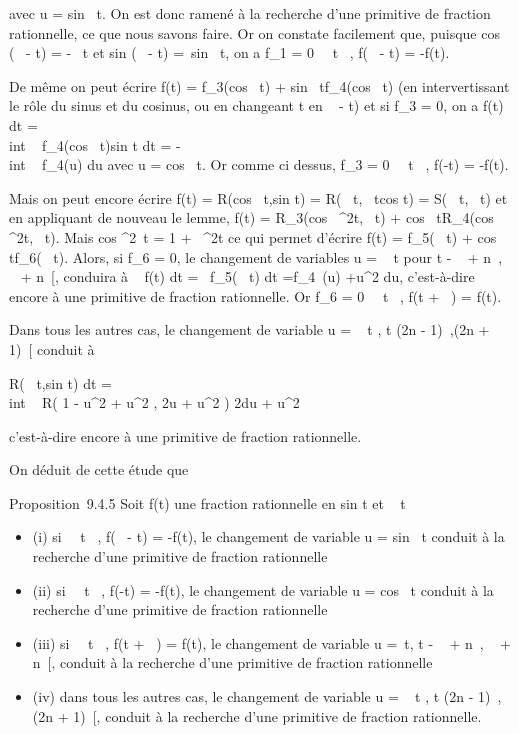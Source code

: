 \documentclass[]{article}
\begin{document}
avec u = sin~ t. On est donc ramené à la
recherche d'une primitive de fraction rationnelle, ce que nous savons
faire. Or on constate facilement que, puisque
cos (\pi~ - t) = -\cos~ t
et sin (\pi~ - t) =\ sin~
t, on a f\_1 = 0 \Leftrightarrow
\forall~~t \in {}~, f(\pi~ - t) = -f(t).

De même on peut écrire f(t) = f\_3(cos~
t) + sin~
tf\_4(cos~ t) (en intervertissant le
rôle du sinus et du cosinus, ou en changeant t en  \pi~
 - t) et si f\_3 = 0, on a
\int  f(t) dt =\\int ~
f\_4(cos~
t)sin t dt = -\\int ~
f\_4(u) du avec u = cos~ t. Or comme ci
dessus, f\_3 = 0 \Leftrightarrow
\forall~~t \in {}~, f(-t) = -f(t).

Mais on peut encore écrire f(t) = R(cos~
t,sin t) = R(\cos~
t,\mathrmtg~
tcos t) = S(\cos~
t,\mathrmtg~ t) et en
appliquant de nouveau le lemme, f(t) =
R\_3(cos~
^2t,\mathrmtg~ t)
+ cos~
tR\_4(cos~
^2t,\mathrmtg~ t).
Mais cos ^2~t = 1
+\mathrmtg~
^2t ce qui permet d'écrire f(t) =
f\_5(\mathrmtg~ t)
+ cos~
tf\_6(\mathrmtg~ t).
Alors, si f\_6 = 0, le changement de variables u
= \mathrmtg~ t pour t \in{]}
- \pi~  + n\pi~, \pi~  +
n\pi~{[}, conduira à \int ~ f(t) dt
=\int ~
f\_5(\mathrmtg~ t)
dt =\int   f\_4~(u) +u^2 du, c'est-à-dire encore à une primitive de fraction
rationnelle. Or f\_6 = 0 \Leftrightarrow
\forall~~t \in {}~, f(t + \pi~) = f(t).

Dans tous les autres cas, le changement de variable u
= \mathrmtg~  t
 , t \in{]}(2n - 1)\pi~,(2n + 1)\pi~{[} conduit à

\int  R(\cos~
t,sin t) dt =\\int ~ R(
1 - u^2  + u^2 , 2u
 + u^2 ) 2du 
+ u^2

c'est-à-dire encore à une primitive de fraction rationnelle.

On déduit de cette étude que

Proposition~9.4.5 Soit f(t) une fraction rationnelle en
sin t et \cos~ t

\begin{itemize}
\itemsep1pt\parskip0pt
\item
  (i) si \forall~~t \in {}~, f(\pi~ - t) = -f(t), le
  changement de variable u = sin~ t conduit à
  la recherche d'une primitive de fraction rationnelle
\item
  (ii) si \forall~~t \in {}~, f(-t) = -f(t), le changement
  de variable u = cos~ t conduit à la recherche
  d'une primitive de fraction rationnelle
\item
  (iii) si \forall~~t \in {}~, f(t + \pi~) = f(t), le
  changement de variable u =\
  \mathrmtg t, t \in{]} - \pi~  + n\pi~, \pi~ \over 2 + n\pi~{[}, conduit à la recherche
  d'une primitive de fraction rationnelle
\item
  (iv) dans tous les autres cas, le changement de variable u
  = \mathrmtg~  t
   , t \in{]}(2n - 1)\pi~,(2n + 1)\pi~{[}, conduit à la
  recherche d'une primitive de fraction rationnelle.
\end{itemize}
\end{document}
